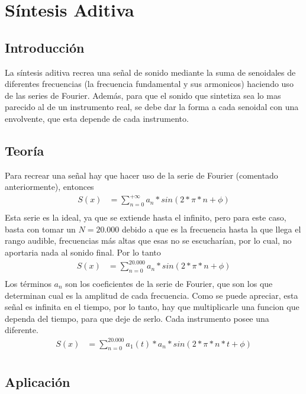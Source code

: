 \documentclass[../ASSD_TP2.tex]{subfiles}
\begin{document}
\section*{S\'intesis Aditiva}
\subsection*{Introducci\'on}
La s\'intesis aditiva recrea una señal de sonido mediante la suma de senoidales de diferentes frecuencias (la frecuencia fundamental y sus armonicos) haciendo uso de las series de Fourier. Adem\'as, para que el sonido que sintetiza sea lo mas parecido al de un instrumento real, se debe dar la forma a cada senoidal con una envolvente, que esta depende de cada instrumento.

\subsection*{Teor\'ia}
Para recrear una señal hay que hacer uso de la serie de Fourier (comentado anteriormente), entonces
\begin{align*}
  S(x) &= \sum_{n=0}^{+\infty} a_n*sin(2*\pi*n + \phi) \\
\end{align*}
Esta serie es la ideal, ya que se extiende hasta el infinito, pero para este caso, basta con tomar un $N = 20.000$ debido a que es la frecuencia hasta la que llega el rango audible, frecuencias m\'as altas que esas no se escuchar\'ian, por lo cual, no aportaria nada al sonido final. Por lo tanto
\begin{align*}
  S(x) &= \sum_{n=0}^{20.000} a_n*sin(2*\pi*n + \phi) \\
\end{align*}
Los t\'erminos $a_n$ son los coeficientes de la serie de Fourier, que son los que determinan cual es la amplitud de cada frecuencia.
Como se puede apreciar, esta señal es infinita en el tiempo, por lo tanto, hay que multiplicarle una funcion que dependa del tiempo, para que deje de serlo. Cada instrumento posee una diferente.
\begin{align*}
  S(x) &= \sum_{n=0}^{20.000}a_1(t)* a_n*sin(2*\pi*n*t + \phi) \\
\end{align*}
\subsection*{Aplicaci\'on}
\end{document}

